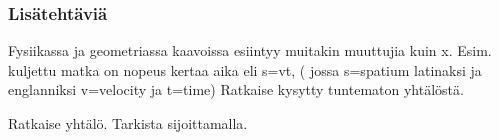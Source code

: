 \begin{tehtavasivu}
\begin{tehtava}
\begin{vastaus}
\end{vastaus}
\end{tehtava}


\subsubsection*{Lisätehtäviä}

\begin{tehtava}
Fysiikassa ja geometriassa kaavoissa esiintyy muitakin muuttujia kuin x.
Esim. kuljettu matka on nopeus kertaa aika eli s=vt, ( jossa
s=spatium latinaksi ja englanniksi v=velocity ja t=time)
Ratkaise kysytty tuntematon yhtälöstä.

\begin{alakohdat}
% 
\end{alakohdat}
\begin{vastaus}
\begin{alakohdat}
\end{alakohdat}
\end{vastaus}
\end{tehtava}

\begin{tehtava}
Ratkaise yhtälö. Tarkista sijoittamalla.
\begin{alakohdat}
\end{alakohdat}
%
\begin{vastaus}
\begin{alakohdat}
\end{alakohdat}
\end{vastaus}
\end{tehtava}


\end{tehtavasivu}
